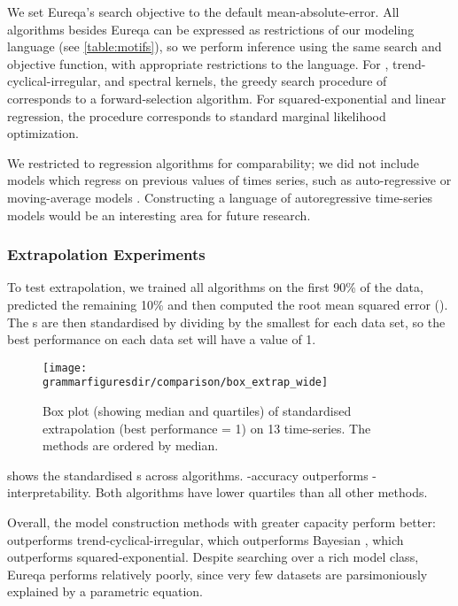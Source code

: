 We set Eureqa's search objective to the default mean-absolute-error.
All algorithms besides Eureqa can be expressed as restrictions of our modeling language (see \cref{table:motifs}), so we perform inference using the same search and objective function, with appropriate restrictions to the language.
For \MKL{}, trend-cyclical-irregular, and spectral kernels, the greedy search procedure of \procedurename{} corresponds to a forward-selection algorithm.
For squared-exponential and linear regression, the procedure corresponds to standard marginal likelihood optimization.

We restricted to regression algorithms for comparability; we did not include models which regress on previous values of times series, such as auto-regressive or moving-average models \citep[e.g.][]{box2013time}.
Constructing a language of autoregressive time-series models would be an interesting area for future research.



\subsubsection{Extrapolation Experiments}

To test extrapolation, we trained all algorithms on the first 90\% of the data, predicted the remaining 10\% and then computed the root mean squared error (\RMSE{}).
The \RMSE{}s are then standardised by dividing by the smallest \RMSE{} for each data set, so the best performance on each data set will have a value of 1.

\begin{figure}[h!]
\texttt{[image: \\grammarfiguresdir/comparison/box\_extrap\_wide]}
\caption[Extrapolation error of all methods on 13 time-series datasets]
{Box plot (showing median and quartiles) of standardised extrapolation \RMSE{} (best performance = 1) on 13 time-series.
The methods are ordered by median.
}
\label{fig:box_extrap_dist}
\end{figure}


 shows the standardised \RMSE{}s across algorithms.
\procedurename{}-accuracy outperforms \procedurename{}-interpretability.
Both algorithms have lower quartiles than all other methods.

Overall, the model construction methods with greater capacity perform better: \procedurename{} outperforms trend-cyclical-irregular, which outperforms Bayesian \MKL{}, which outperforms squared-exponential.
Despite searching over a rich model class, Eureqa performs relatively poorly, since very few datasets are parsimoniously explained by a parametric equation.

